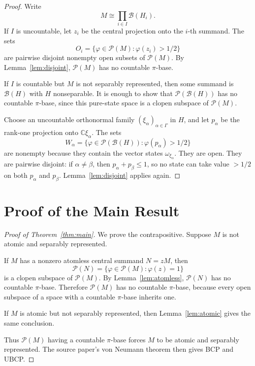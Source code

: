 \documentclass[11pt]{article}
\newcommand{\C}{\mathbb C}
\newcommand{\Bcal}{\mathcal B}
\newcommand{\Pcal}{\mathcal P}
\begin{document}
\begin{proof}
Write
\[
        M\cong \prod_{i\in I}\Bcal(H_i).
\]
If \(I\) is uncountable, let \(z_i\) be the central projection onto the
\(i\)-th summand.  The sets
\[
        O_i=\{\varphi\in\Pcal(M):\varphi(z_i)>1/2\}
\]
are pairwise disjoint nonempty open subsets of \(\Pcal(M)\).  By
Lemma~\ref{lem:disjoint}, \(\Pcal(M)\) has no countable \(\pi\)-base.

If \(I\) is countable but \(M\) is not separably represented, then some
summand is \(\Bcal(H)\) with \(H\) nonseparable.  It is enough to show that
\(\Pcal(\Bcal(H))\) has no countable \(\pi\)-base, since this pure-state
space is a clopen subspace of \(\Pcal(M)\).

Choose an uncountable orthonormal family \((\xi_\alpha)_{\alpha\in\Gamma}\)
in \(H\), and let \(p_\alpha\) be the rank-one projection onto
\(\C\xi_\alpha\).  The sets
\[
        W_\alpha
        =
        \{\varphi\in\Pcal(\Bcal(H)):\varphi(p_\alpha)>1/2\}
\]
are nonempty because they contain the vector states \(\omega_{\xi_\alpha}\).
They are open.  They are pairwise disjoint: if \(\alpha\ne\beta\), then
\(p_\alpha+p_\beta\le1\), so no state can take value \(>1/2\) on both
\(p_\alpha\) and \(p_\beta\).  Lemma~\ref{lem:disjoint} applies again.
\end{proof}

\section*{Proof of the Main Result}

\begin{proof}[Proof of Theorem~\ref{thm:main}]
We prove the contrapositive.  Suppose \(M\) is not atomic and separably
represented.

If \(M\) has a nonzero atomless central summand \(N=zM\), then
\[
        \Pcal(N)=\{\varphi\in\Pcal(M):\varphi(z)=1\}
\]
is a clopen subspace of \(\Pcal(M)\).  By Lemma~\ref{lem:atomless},
\(\Pcal(N)\) has no countable \(\pi\)-base.  Therefore \(\Pcal(M)\) has no
countable \(\pi\)-base, because every open subspace of a space with a
countable \(\pi\)-base inherits one.

If \(M\) is atomic but not separably represented, then
Lemma~\ref{lem:atomic} gives the same conclusion.

Thus \(\Pcal(M)\) having a countable \(\pi\)-base forces \(M\) to be atomic
and separably represented.  The source paper's von Neumann theorem then gives
BCP and UBCP.
\end{proof}
\end{document}
